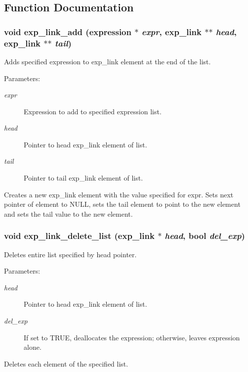 \subsection{Function Documentation}
\subsubsection{\setlength{\rightskip}{0pt plus 5cm}void exp\_\-link\_\-add ({\bf expression} $\ast$ {\em expr}, {\bf exp\_\-link} $\ast$$\ast$ {\em head}, {\bf exp\_\-link} $\ast$$\ast$ {\em tail})}\label{link_8c_a3}


Adds specified expression to exp\_\-link element at the end of the list. 

\begin{Desc}
\item[Parameters:]
\begin{description}
\item[{\em expr}]Expression to add to specified expression list. \item[{\em head}]Pointer to head exp\_\-link element of list. \item[{\em tail}]Pointer to tail exp\_\-link element of list.\end{description}
\end{Desc}
Creates a new exp\_\-link element with the value specified for expr. Sets next pointer of element to NULL, sets the tail element to point to the new element and sets the tail value to the new element. 
\subsubsection{\setlength{\rightskip}{0pt plus 5cm}void exp\_\-link\_\-delete\_\-list ({\bf exp\_\-link} $\ast$ {\em head}, {\bf bool} {\em del\_\-exp})}\label{link_8c_a20}


Deletes entire list specified by head pointer. 

\begin{Desc}
\item[Parameters:]
\begin{description}
\item[{\em head}]Pointer to head exp\_\-link element of list. \item[{\em del\_\-exp}]If set to TRUE, deallocates the expression; otherwise, leaves expression alone.\end{description}
\end{Desc}
Deletes each element of the specified list. 
